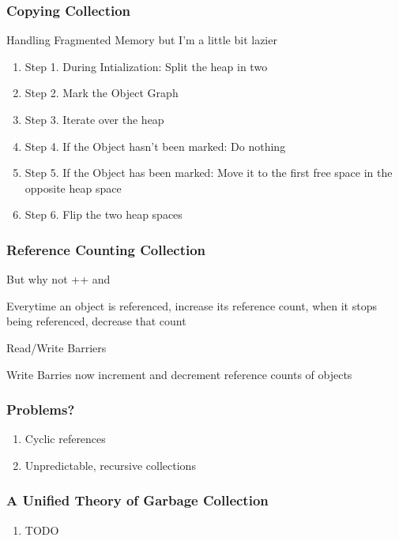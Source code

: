 \documentclass{beamer}
\begin{document}
\begin{frame}
  \frametitle{Copying Collection}
  \begin{heading}
    Handling Fragmented Memory but I'm a little bit lazier
  \end{heading}

  \begin{enumerate}
    \item Step 1. During Intialization: Split the heap in two
    \item Step 2. Mark the Object Graph
    \item Step 3. Iterate over the heap
    \item Step 4. If the Object hasn't been marked: Do nothing
    \item Step 5. If the Object has    been marked: Move it to the first free space in the opposite heap space
    \item Step 6. Flip the two heap spaces
  \end{enumerate}
\end{frame}

\begin{frame}
  \frametitle{Reference Counting Collection}

  \begin{heading}
    But why not ++ and \textendash{} \textendash{}
  \end{heading}

  \item Everytime an object is referenced, increase its reference count, when it stops being referenced, decrease that count
  \item Read/Write Barriers
  \item Write Barries now increment and decrement reference counts of objects
\end{frame}

\begin{frame}
  \frametitle{Problems?}
  \begin{enumerate}
      \pause{}
    \item Cyclic references
      \pause{}
    \item Unpredictable, recursive collections
  \end{enumerate}
\end{frame}

\begin{frame}
  \frametitle{A Unified Theory of Garbage Collection}
  
  \begin{enumerate}
    \item TODO
  \end{enumerate}
\end{frame}
\end{document}
